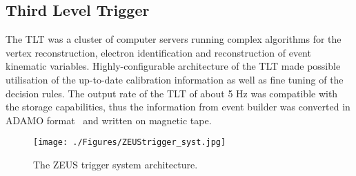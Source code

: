 \subsection{Third Level Trigger}
\label{subsec:tlt}
The TLT was a cluster of computer servers running complex algorithms for the vertex reconstruction, electron identification and reconstruction of event kinematic variables. Highly-configurable architecture of the TLT made possible utilisation of the up-to-date calibration information as well as fine tuning of the decision rules. The output rate of the TLT of about 5 Hz was compatible with the storage capabilities, thus the information from event builder was converted in ADAMO format~\cite{adamo} and written on magnetic tape.

\begin{figure}[h]
	\centering
		\texttt{[image: ./Figures/ZEUStrigger\_syst.jpg]}
	\caption{The ZEUS trigger system architecture.}
	\label{fig:ZEUStrigger_syst}
\end{figure}
\newpage
